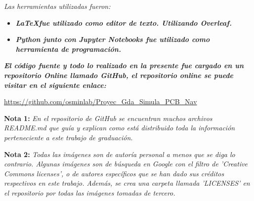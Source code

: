 \begin{flushleft}
{\sffamily\small\textit{Las herramientas utilizadas fueron: }}

\begin{itemize}
    \item {\sffamily\bfseries\small\textit{\LaTeX     \space fue utilizado como editor de texto. Utilizando Overleaf.}}
    \item {\sffamily\bfseries\small\textit{Python junto con Jupyter Notebooks fue utilizado como herramienta de programación.  }}
\end{itemize}

\vspace{1cm}

{\sffamily\bfseries\small\textit{El código fuente y todo lo realizado en la presente fue cargado en un repositorio Online llamado GitHub, el repositorio online se puede visitar en el siguiente enlace: }}

\vspace{0.5cm}

\begin{center}
\href{https://github.com/osminlab/Proyec_Gda_Simula_PCB_Nav}{https://github.com/osminlab/Proyec\_Gda\_Simula\_PCB\_Nav}
\end{center} 

\vspace{0.5cm}

\textbf{Nota 1: } {\sffamily\small\textit{En el repositorio de GitHub se encuentran  muchos archivos README.md que guía y explican como está distribuido toda la información perteneciente a este trabajo de graduación.}}

\textbf{Nota 2:} {\sffamily\small\textit{Todas las imágenes son de autoría personal a menos que se diga lo contrario. Algunas imágenes son de búsqueda en Google con el filtro de 'Creative Commons licenses',  o de autores específicos que se han dado sus créditos respectivos en este trabajo. Además, se crea una carpeta llamada 'LICENSES' en el repositorio por todas las imágenes tomadas de tercero.}}
\end{flushleft}


